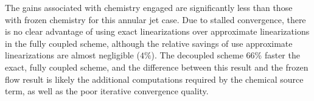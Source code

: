 The gains associated with chemistry engaged are significantly less than those
with frozen chemistry for this annular jet case.  Due to stalled convergence,
there is no clear advantage of using exact linearizations over approximate
linearizations in the fully coupled scheme, although the relative savings of use
approximate linearizations are almost negligible ($4\%$).  The decoupled scheme
66\% faster the exact, fully coupled scheme, and the difference between this
result and the frozen flow result is likely the additional computations required
by the chemical source term, as well as the poor iterative convergence quality.

